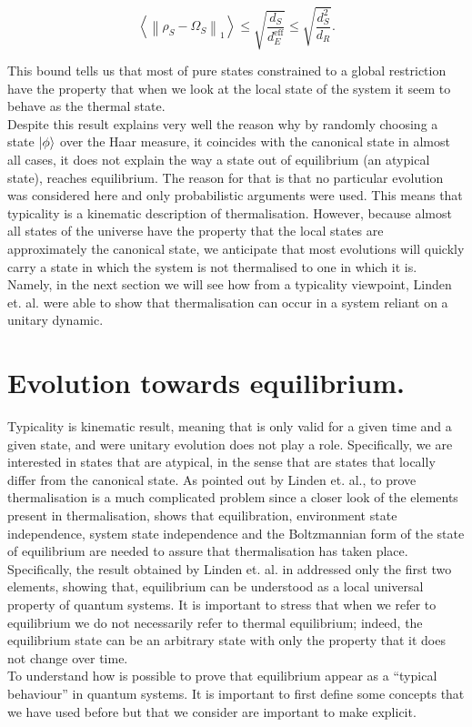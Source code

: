 \begin{equation}
\left\langle\left\|\rho_{S}-\Omega_{S}\right\|_{1}\right\rangle \leq \sqrt{\frac{d_S}{d_E^{\mathrm{eff}}}}\leq\sqrt{\frac{d_{S}^{2}}{d_{R}}}.
\label{CH1:Typicality_result_2}
\end{equation}

This bound tells us that most of pure states constrained to a global restriction have the property that when we look at the local state of the system it seem to behave as the thermal state.\\
\indent Despite this result explains very well the reason why by randomly choosing a state $\mathinner{|{\phi}\rangle}$ over the Haar measure, it coincides with the canonical state in almost all cases, it does not explain the way a state out of equilibrium (an atypical state), reaches equilibrium. The reason for that is that no particular evolution was considered here and only probabilistic arguments were used. This means that typicality is a kinematic description of thermalisation. However, because almost all states of the universe have the property that the local states are approximately the canonical state, we anticipate that most evolutions will quickly carry a state in which the system is not thermalised to one in which it is. Namely, in the next section we will see how from a typicality viewpoint,  Linden et. al.\cite{linden_quantum_2009} were able to show that thermalisation can occur in a system reliant on a unitary dynamic.

\section{Evolution towards equilibrium.}

Typicality is kinematic result, meaning that is only valid for a given time and a given state, and were unitary evolution does not play a role. Specifically, we are interested in states that are atypical, in the sense that are states that locally differ from the canonical state. As pointed out by Linden et. al.\cite{linden_quantum_2009}, to prove thermalisation is a much complicated problem since a closer look of the elements present in thermalisation, shows that equilibration, environment state independence, system state independence and the Boltzmannian form of the state of equilibrium are needed to assure that thermalisation has taken place. Specifically, the result obtained by Linden et. al. in \cite{linden_quantum_2009} addressed only the first two elements, showing that, equilibrium can be understood as a local universal property of quantum systems. It is important to stress that when we refer to equilibrium we do not necessarily refer to thermal equilibrium; indeed, the equilibrium state can be an arbitrary state with only the property that it does not change over time.\\
\indent To understand how is possible to prove that equilibrium appear as a ``typical behaviour'' in quantum systems. It is important to first define some concepts that we have used before but that we consider are important to make explicit.\\

